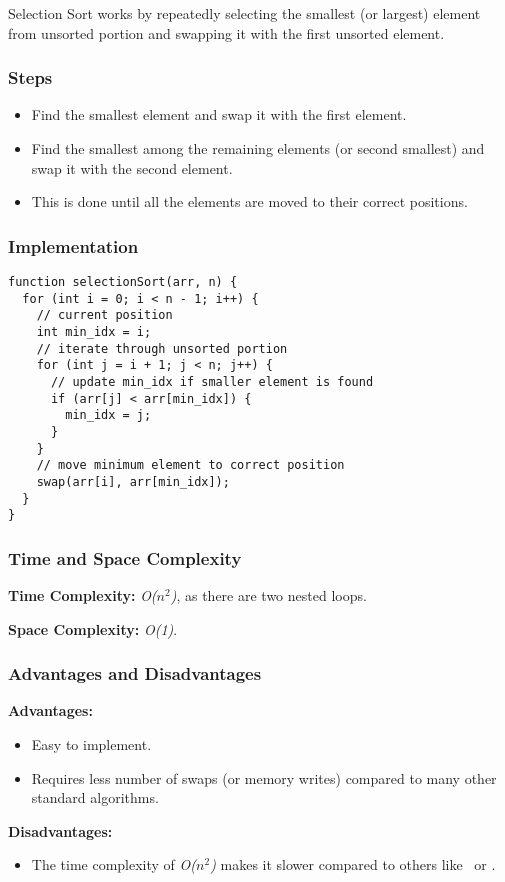 Selection Sort works by repeatedly selecting the smallest (or largest) element from unsorted portion and swapping it with the first unsorted element.

\subsubsection*{Steps}

\begin{itemize}
  \item Find the smallest element and swap it with the first element.
  \item Find the smallest among the remaining elements (or second smallest) and swap it with the second element.
  \item This is done until all the elements are moved to their correct positions.
\end{itemize}

\subsubsection*{Implementation}

\begin{lstlisting}[style=general]
function selectionSort(arr, n) {
  for (int i = 0; i < n - 1; i++) {
    // current position
    int min_idx = i;
    // iterate through unsorted portion
    for (int j = i + 1; j < n; j++) {
      // update min_idx if smaller element is found
      if (arr[j] < arr[min_idx]) {
        min_idx = j;
      }
    }
    // move minimum element to correct position
    swap(arr[i], arr[min_idx]);
  }
}
\end{lstlisting}

\subsubsection*{Time and Space Complexity}

\textbf{Time Complexity:} \textit{O($n^2$)}, as there are two nested loops.

\textbf{Space Complexity:} \textit{O(1)}.

\subsubsection*{Advantages and Disadvantages}

\textbf{Advantages:}

\begin{itemize}
  \item Easy to implement.
  \item Requires less number of swaps (or memory writes) compared to many other standard algorithms.
\end{itemize}

\textbf{Disadvantages:}

\begin{itemize}
  \item The time complexity of \textit{O($n^2$)} makes it slower compared to others like \quicksrt\ or \mergesrt.
\end{itemize}
